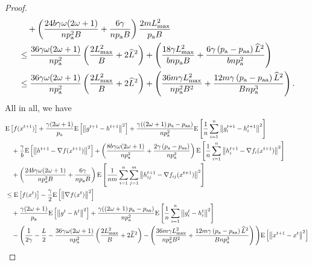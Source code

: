 \documentclass{article}
\newcommand*{\probavailable}{\ensuremath{p_{\textnormal{a}}}}
\newcommand*{\probpairaa}{\ensuremath{p_{\textnormal{aa}}}}
\begin{document}
\begin{proof}
\begin{align*}
      &\quad + \left(\frac{24 b \gamma \omega (2 \omega + 1)}{n \probavailable^2 B} + \frac{6 \gamma }{n \probavailable B}\right) \frac{2 m L_{\max}^2}{\probavailable B} \\
      &\leq \frac{36 \gamma \omega (2 \omega + 1)}{n \probavailable^2} \left(\frac{2 L_{\max}^2}{B} + 2 \widehat{L}^2\right) + \left(\frac{18 \gamma L_{\max}^2}{b n \probavailable B} + \frac{6 \gamma \left(\probavailable - \probpairaa\right) \widehat{L}^2}{b n \probavailable^2}\right) \\
      &\leq \frac{36 \gamma \omega (2 \omega + 1)}{n \probavailable^2} \left(\frac{2 L_{\max}^2}{B} + 2 \widehat{L}^2\right) + \left(\frac{36 m \gamma L_{\max}^2}{n \probavailable^2 B^2} + \frac{12 m \gamma \left(\probavailable - \probpairaa\right) \widehat{L}^2}{B n \probavailable^3}\right).
    \end{align*}
    All in all, we have
    \begin{align*}
      &\Exp{f(x^{t + 1})} + \frac{\gamma (2 \omega + 1)}{\probavailable} \Exp{\norm{g^{t+1} - h^{t+1}}^2} + \frac{\gamma (\left(2 \omega + 1\right)\probavailable - \probpairaa)}{n \probavailable^2} \Exp{\frac{1}{n}\sum_{i=1}^n\norm{g^{t+1}_i - h^{t+1}_i}^2}\\
      &\quad  + \frac{\gamma}{b} \Exp{\norm{h^{t+1} - \nabla f(x^{t+1})}^2} + \left(\frac{8 b \gamma \omega (2 \omega + 1)}{n \probavailable^2} + \frac{2 \gamma \left(\probavailable - \probpairaa\right)}{n \probavailable^2}\right) \Exp{\frac{1}{n}\sum_{i=1}^n\norm{h^{t+1}_i - \nabla f_i(x^{t+1})}^2}\\
      &\quad + \left(\frac{24 b \gamma \omega (2 \omega + 1)}{n \probavailable^2 B} + \frac{6 \gamma }{n \probavailable B}\right) \Exp{\frac{1}{nm}\sum_{i=1}^n\sum_{j=1}^m\norm{h^{t+1}_{ij} - \nabla f_{ij}(x^{t+1})}^2} \\
      &\leq \Exp{f(x^t)} - \frac{\gamma}{2}\Exp{\norm{\nabla f(x^t)}^2} \\
      &\quad + \frac{\gamma (2 \omega + 1)}{\probavailable} \Exp{\norm{g^{t} - h^{t}}^2} + \frac{\gamma (\left(2 \omega + 1\right)\probavailable - \probpairaa)}{n \probavailable^2} \Exp{\frac{1}{n}\sum_{i=1}^n\norm{g^{t}_i - h^{t}_i}^2} \\
      &\quad - \Bigg(\frac{1}{2\gamma} - \frac{L}{2} - \frac{36 \gamma \omega (2 \omega + 1)}{n \probavailable^2} \left(\frac{2 L_{\max}^2}{B} + 2 \widehat{L}^2\right) - \left(\frac{36 m \gamma L_{\max}^2}{n \probavailable^2 B^2} + \frac{12 m \gamma \left(\probavailable - \probpairaa\right) \widehat{L}^2}{B n \probavailable^3}\right) \Bigg) \Exp{\norm{x^{t+1} - x^t}^2} \\

\end{align*}
\end{proof}
\end{document}

